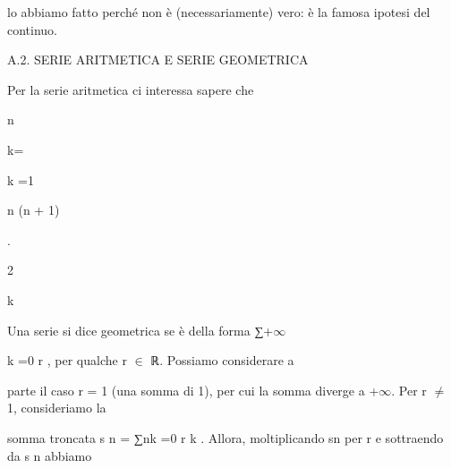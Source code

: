 \documentclass[a4paper,portrait,12pt]{article}
\begin{document}
\begin{flushleft}
lo abbiamo fatto perch\'{e} non \`{e} (necessariamente) vero: \`{e} la famosa ipotesi del continuo.
\end{flushleft}





\begin{flushleft}
A.2. SERIE ARITMETICA E SERIE GEOMETRICA
\end{flushleft}


\begin{flushleft}
Per la serie aritmetica ci interessa sapere che
\end{flushleft}


\begin{flushleft}
n
\end{flushleft}





\begin{flushleft}
k=
\end{flushleft}


\begin{flushleft}
k =1
\end{flushleft}





\begin{flushleft}
n (n + 1)
\end{flushleft}


.


2





\begin{flushleft}
k
\end{flushleft}


\begin{flushleft}
Una serie si dice geometrica se \`{e} della forma ∑+$\infty$
\end{flushleft}


\begin{flushleft}
k =0 r , per qualche r $\in$ ℝ. Possiamo considerare a
\end{flushleft}


\begin{flushleft}
parte il caso r = 1 (una somma di 1), per cui la somma diverge a +$\infty$. Per r $\neq$ 1, consideriamo la
\end{flushleft}


\begin{flushleft}
somma troncata s n = ∑nk =0 r k . Allora, moltiplicando sn per r e sottraendo da s n abbiamo
\end{flushleft}
\end{document}
